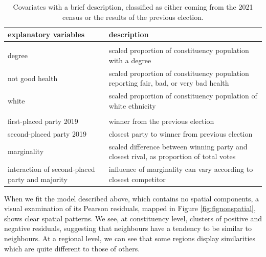 \documentclass[webpdf,large,contemporary,namedate]{oup-authoring-template}
\theoremstyle{thmstyleone}
\theoremstyle{thmstyletwo}
\theoremstyle{thmstylethree}
\begin{document}
\begin{table}

\caption{\label{tab:tabcovariates}Covariates with a brief description, classified as either coming from the 2021 census or the results of the previous election.}
\centering
\fontsize{8}{10}\selectfont
\begin{tabular}[t]{>{\raggedleft\arraybackslash}p{4cm}>{\raggedright\arraybackslash}p{12cm}}
\toprule
explanatory variables & description\\
\midrule
\addlinespace[0.3em]
\hline
\multicolumn{2}{l}{\textbf{census 2021}}\\
\hspace{1em}degree & scaled proportion of constituency population with a degree\\
\hspace{1em}not good health & scaled proportion of constituency population reporting fair, bad, or very bad health\\
\hspace{1em}white & scaled proportion of constituency population of white ethnicity\\
\addlinespace[0.3em]
\hline
\multicolumn{2}{l}{\textbf{status quo ante}}\\
\hspace{1em}first-placed party 2019 & winner from the previous election\\
\hspace{1em}second-placed party 2019 & closest party to winner from previous election\\
\hspace{1em}marginality & scaled difference between winning party and closest rival, as proportion of total votes\\
\hspace{1em}interaction of second-placed party and majority & influence of marginality can vary according to closest competitor\\
\bottomrule
\end{tabular}
\end{table}

When we fit the model described above, which contains no spatial
components, a visual examination of its Pearson residuals, mapped in
Figure \ref{fig:fignonspatial}, shows clear spatial patterns. We see, at
constituency level, clusters of positive and negative residuals,
suggesting that neighbours have a tendency to be similar to neighbours.
At a regional level, we can see that some regions display similarities
which are quite different to those of others.
\end{document}
